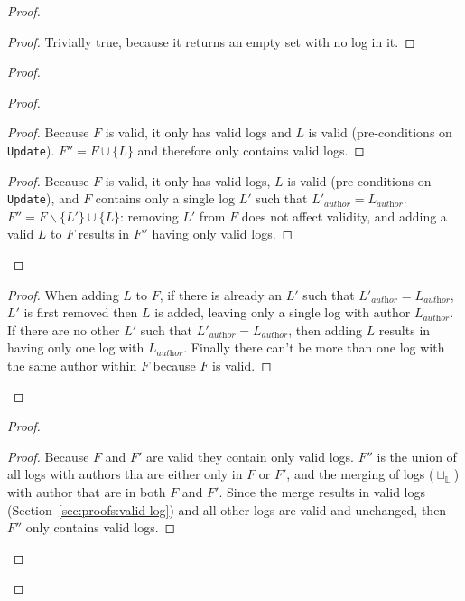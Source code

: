 \documentclass[9pt, oneside]{article}   	%
\begin{document}
\begin{proof}
	\begin{proof}
	Trivially true, because it returns an empty set with no log in it.
	\end{proof}
	
	\begin{proof}
		\begin{proof}			
			\begin{proof}
				Because $F$ is valid, it only has valid logs and $L$  is valid (pre-conditions on \texttt{Update}). $F'' = F \cup \{ L \}$ and therefore only contains valid logs.
			\end{proof}
			
			\begin{proof}
				Because $F$ is valid, it only has valid logs, $L$  is valid (pre-conditions on \texttt{Update}), and $F$ contains only a single log $L'$ such that $L'_\textit{author} = L_\textit{author}$. $F'' = F \backslash \{ L' \} \cup \{ L \}$: removing $L'$ from $F$ does not affect validity, and adding a valid $L$ to $F$ results in $F''$ having only valid logs.
			\end{proof}
		\end{proof}
		
		\begin{proof}
		When adding $L$ to $F$, if there is already an $L'$ such that $L'_\textit{author} = L_\textit{author}$, $L'$ is first removed then $L$ is added, leaving only a single log with author $L_\textit{author}$. If there are no other $L'$ such that $L'_\textit{author} = L_\textit{author}$, then adding $L$ results in having only one log with $L_\textit{author}$. Finally there can't be more than one log with the same author within $F$ because $F$ is valid.
		\end{proof}
	\end{proof}
	
	\begin{proof}
		\begin{proof}
		Because $F$ and $F'$ are valid they contain only valid logs. $F''$ is the union of all logs with authors tha are either only in $F$ or $F'$, and the merging of logs ($\sqcup_\mathds{L}$) with author that are in both $F$ and $F'$. Since the merge results in valid logs (Section~\ref{sec:proofs:valid-log}) and all other logs are valid and unchanged, then $F''$ only contains valid logs.
		\end{proof}
		

\end{proof}
\end{proof}
\end{document}
